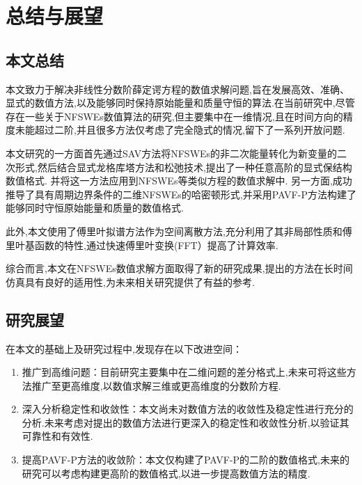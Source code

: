 
\chapter[总结与展望]{总结与展望}
\section{本文总结}

本文致力于解决非线性分数阶薛定谔方程的数值求解问题,旨在发展高效、准确、显式的数值方法,以及能够同时保持原始能量和质量守恒的算法.在当前研究中,尽管存在一些关于NFSWEs数值算法的研究,但主要集中在一维情况,且在时间方向的精度未能超过二阶,并且很多方法仅考虑了完全隐式的情况,留下了一系列开放问题.

本文研究的一方面首先通过SAV方法将NFSWEs的非二次能量转化为新变量的二次形式,然后结合显式龙格库塔方法和松弛技术,提出了一种任意高阶的显式保结构数值格式.
并将这一方法应用到NFSWEs等类似方程的数值求解中.
另一方面,成功推导了具有周期边界条件的二维NFSWEs的哈密顿形式,并采用PAVF-P方法构建了能够同时守恒原始能量和质量的数值格式.

此外,本文使用了傅里叶拟谱方法作为空间离散方法,充分利用了其非局部性质和傅里叶基函数的特性,通过快速傅里叶变换(FFT）提高了计算效率.

综合而言,本文在NFSWEs数值求解方面取得了新的研究成果,提出的方法在长时间仿真具有良好的适用性,为未来相关研究提供了有益的参考.

\section{研究展望}
在本文的基础上及研究过程中,发现存在以下改进空间：

\begin{enumerate}[(1)]
    \item 推广到高维问题：目前研究主要集中在二维问题的差分格式上,未来可将这些方法推广至更高维度,以数值求解三维或更高维度的分数阶方程.
    
    \item 深入分析稳定性和收敛性：本文尚未对数值方法的收敛性及稳定性进行充分的分析.未来考虑对提出的数值方法进行更深入的稳定性和收敛性分析,以验证其可靠性和有效性.
    
    \item 提高PAVF-P方法的收敛阶：本文仅构建了PAVF-P的二阶的数值格式,未来的研究可以考虑构建更高阶的数值格式,以进一步提高数值方法的精度.
\end{enumerate}

